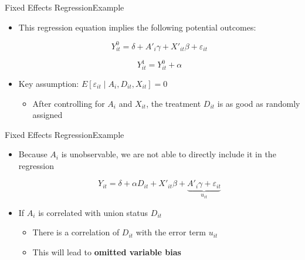 \documentclass[dvipsnames,hyperref={pdfpagelabels=false}]{beamer}
\begin{document}
\begin{frame}{Fixed Effects Regression}{Example}
	\begin{itemize}
		\item This regression equation implies the following potential outcomes:

		\begin{equation*}
		Y^{0}_{it}=\delta+A'_i\gamma+X'_{it}\beta+ \varepsilon_{it}
		\end{equation*}

		\begin{equation*}
			Y^{1}_{it}=Y^{0}_{it}+ \alpha
		\end{equation*}

		\item Key assumption: $E[\varepsilon_{it}\mid A_i, D_{it}, X_{it}]=0$
		\vspace{0.2cm}
		\begin{itemize}
			\item After controlling for $A_i$ and $X_{it}$, the treatment $D_{it}$ is as good as randomly assigned

		\end{itemize}
	\end{itemize}
\end{frame}







\begin{frame}{Fixed Effects Regression}{Example}
	\begin{itemize} 
		
		\item Because $A_i$ is unobservable, we are not able to directly include it in the regression 
		
				\begin{equation*}
			Y_{it}=\delta+\alpha D_{it}+X'_{it}\beta +\underbrace{A'_i\gamma+\varepsilon_{it}}_{u_{it}}
		\end{equation*}
		
		\item If $A_i$ is correlated with union status $D_{it}$ 
		\vspace{0.2cm}
			\begin{itemize} 
		\item There is a correlation of $D_{it}$ with the error term $u_{it}$
		\vspace{0.2cm}
		\item This will lead to \textbf{omitted variable bias}
	\end{itemize}
	\end{itemize}
\end{frame}
\end{document}
